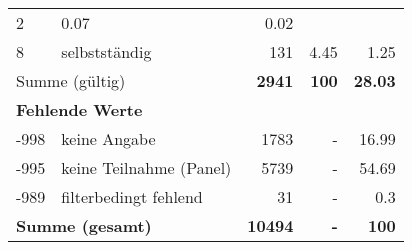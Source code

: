 \begin{longtable}{lXrrr}
       \num{2} &
       \num[round-mode=places,round-precision=2]{0,07} &
         \num[round-mode=places,round-precision=2]{0,02} \\

     8 &
     \multicolumn{1}{X}{ selbstständig   } &


       \num{131} &
       \num[round-mode=places,round-precision=2]{4,45} &
         \num[round-mode=places,round-precision=2]{1,25} \\
     \midrule
     \multicolumn{2}{l}{Summe (gültig)} &
       \textbf{\num{2941}} &
     \textbf{100} &
       \textbf{\num[round-mode=places,round-precision=2]{28,03}} \\
     \multicolumn{5}{l}{\textbf{Fehlende Werte}}\\
       -998 &
       keine Angabe &
         \num{1783} &
        - &
         \num[round-mode=places,round-precision=2]{16,99} \\
       -995 &
       keine Teilnahme (Panel) &
         \num{5739} &
        - &
         \num[round-mode=places,round-precision=2]{54,69} \\
       -989 &
       filterbedingt fehlend &
         \num{31} &
        - &
         \num[round-mode=places,round-precision=2]{0,3} \\
     \midrule
     \multicolumn{2}{l}{\textbf{Summe (gesamt)}} &
          \textbf{\num{10494}} &
        \textbf{-} &
        \textbf{100} \\
     \bottomrule
     \end{longtable}
     
